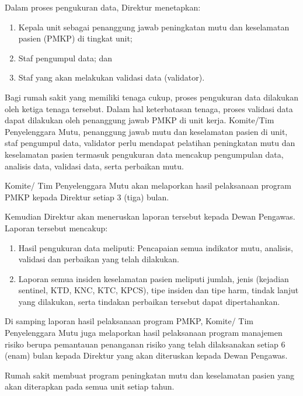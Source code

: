 \documentclass[
]{book}
\providecommand{\tightlist}{%
  \setlength{\itemsep}{0pt}\setlength{\parskip}{0pt}}
\begin{document}
Dalam proses pengukuran data, Direktur menetapkan:

\begin{enumerate}
\def\labelenumi{\alph{enumi}.}
\tightlist
\item
  Kepala unit sebagai penanggung jawab peningkatan mutu dan keselamatan pasien (PMKP) di tingkat unit;
\item
  Staf pengumpul data; dan
\item
  Staf yang akan melakukan validasi data (validator).
\end{enumerate}

Bagi rumah sakit yang memiliki tenaga cukup, proses pengukuran data dilakukan oleh ketiga tenaga tersebut. Dalam hal keterbatasan tenaga, proses validasi data dapat dilakukan oleh penanggung jawab PMKP di unit kerja. Komite/Tim Penyelenggara Mutu, penanggung jawab mutu dan keselamatan pasien di unit, staf pengumpul data, validator perlu mendapat pelatihan peningkatan mutu dan keselamatan pasien termasuk pengukuran data mencakup pengumpulan data, analisis data, validasi data, serta perbaikan mutu.

Komite/ Tim Penyelenggara Mutu akan melaporkan hasil pelaksanaan program PMKP kepada Direktur setiap 3 (tiga) bulan.

Kemudian Direktur akan meneruskan laporan tersebut kepada Dewan Pengawas. Laporan tersebut mencakup:

\begin{enumerate}
\def\labelenumi{\alph{enumi}.}
\tightlist
\item
  Hasil pengukuran data meliputi: Pencapaian semua indikator mutu, analisis, validasi dan perbaikan yang telah dilakukan.
\item
  Laporan semua insiden keselamatan pasien meliputi jumlah, jenis (kejadian sentinel, KTD, KNC, KTC, KPCS), tipe insiden dan tipe harm, tindak lanjut yang dilakukan, serta tindakan perbaikan tersebut dapat dipertahankan.
\end{enumerate}

Di samping laporan hasil pelaksanaan program PMKP, Komite/ Tim Penyelenggara Mutu juga melaporkan hasil pelaksanaan program manajemen risiko berupa pemantauan penanganan risiko yang telah dilaksanakan setiap 6 (enam) bulan kepada Direktur yang akan diteruskan kepada Dewan Pengawas.

Rumah sakit membuat program peningkatan mutu dan keselamatan pasien yang akan diterapkan pada semua unit setiap tahun.
\end{document}
